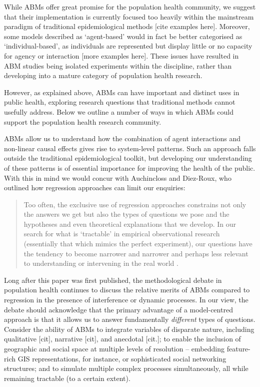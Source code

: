 \documentclass[review]{elsarticle}
\begin{document}
While ABMs offer great promise for the population health community, we suggest that their implementation is currently focused too heavily within the mainstream paradigm of traditional epidemiological methods [cite examples here].  Moreover, some models described as `agent-based' would in fact be better categorised as `individual-based', as individuals are represented but display little or no capacity for agency or interaction [more examples here]. These issues have resulted in ABM studies being isolated experiments within the discipline, rather than developing into a mature category of population health research.  

However, as explained above, ABMs can have important and distinct uses in public health, exploring research questions that traditional methods cannot usefully address. Below we outline a number of ways in which ABMs could support the population health research community.

ABMs allow us to understand how the combination of agent interactions and non-linear causal effects gives rise to system-level patterns. Such an approach falls outside the traditional epidemiological toolkit, but developing our understanding of these patterns is of essential importance for improving the health of the public. With this in mind we would concur with Auchincloss and Diez-Roux, who outlined how regression approaches can limit our enquiries:

\begin{quote}
Too often, the exclusive use of regression approaches constrains not only the answers we get but also the types of questions we pose and the hypotheses and even theoretical explanations that we develop. In our search for what is `tractable' in empirical observational research (essentially that which mimics the perfect experiment), our questions have the tendency to become narrower and narrower and perhaps less relevant to understanding or intervening in the real world \citep[][p. 6]{auchincloss2008}.
\end{quote}

Long after this paper was first published, the methodological debate in population health continues to discuss the relative merits of ABMs compared to regression in the presence of interference or dynamic processes. In our view, the debate should acknowledge that the primary advantage of a model-centred approach is that it allows us to answer fundamentally \emph{different} types of questions. Consider the ability of ABMs to integrate variables of disparate nature, including qualitative [cit], narrative [cit], and anecdotal [cit.]; to enable the inclusion of geographic and social space at multiple levels of resolution -- embedding feature-rich GIS representations, for instance, or sophisticated social networking structures; and to simulate multiple complex processes simultaneously, all while remaining tractable (to a certain extent).
\end{document}
